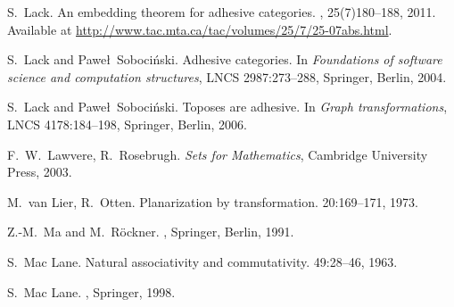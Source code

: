 \begin{thebibliography}{RSW00}
    S.\ Lack.
    \newblock An embedding theorem for adhesive categories.
    , 25(7)180--188, 2011.
    \newblock Available at
    \href{http://www.tac.mta.ca/tac/volumes/25/7/25-07abs.html}{http://www.tac.mta.ca/tac/volumes/25/7/25-07abs.html}.

    S.\ Lack and Pawe\l\ Soboci\'nski. 
    \newblock Adhesive categories. 
    \newblock In {\em Foundations of software science and computation
    structures}, LNCS 2987:273--288, Springer, Berlin, 2004.
    
    S.\ Lack and Pawe\l\ Soboci\'nski. 
    \newblock Toposes are adhesive. 
    \newblock In {\em Graph transformations}, LNCS 4178:184--198,
    Springer, Berlin, 2006.

%
    F.\ W.\ Lawvere, R.\ Rosebrugh.
    \newblock \emph{Sets for Mathematics},
    Cambridge University Press, 2003.

    M.\ van Lier, R.\ Otten.
    \newblock Planarization by transformation.
     { 20}:169--171, 1973.

    Z.-M.\ Ma and M.\ R\"ockner.
    , Springer, Berlin, 1991.

    S.\ Mac Lane.
    \newblock Natural associativity and commutativity.
     { 49}:28--46, 1963. 


    S.\ Mac Lane.
    ,
    Springer, 1998.
    

\end{thebibliography}

